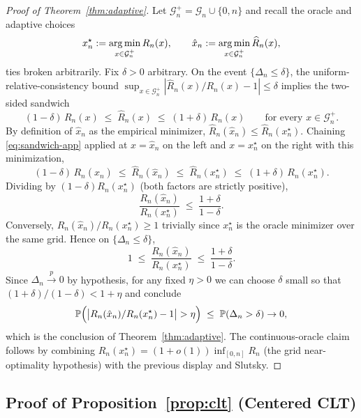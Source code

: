 \begin{proof}[Proof of Theorem~\ref{thm:adaptive}]
Let $\mathcal{G}_n^+ = \mathcal{G}_n \cup \{0, n\}$ and recall the oracle and adaptive choices
\[
x_n^\star := \operatorname*{arg\,min}_{x \in \mathcal{G}_n^+} R_n(x), \qquad
\hat x_n := \operatorname*{arg\,min}_{x \in \mathcal{G}_n^+} \widehat R_n(x),
\]
ties broken arbitrarily. Fix $\delta > 0$ arbitrary. On the event $\{\Delta_n \le \delta\}$, the uniform-relative-consistency bound $\sup_{x \in \mathcal{G}_n^+} |\widehat R_n(x)/R_n(x) - 1| \le \delta$ implies the two-sided sandwich
\begin{equation}\label{eq:sandwich-app}
(1 - \delta)\, R_n(x) \;\le\; \widehat R_n(x) \;\le\; (1 + \delta)\, R_n(x)
\qquad \text{for every } x \in \mathcal{G}_n^+.
\end{equation}
By definition of $\hat x_n$ as the empirical minimizer, $\widehat R_n(\hat x_n) \le \widehat R_n(x_n^\star)$. Chaining \cref{eq:sandwich-app} applied at $x = \hat x_n$ on the left and $x = x_n^\star$ on the right with this minimization,
\[
(1 - \delta)\, R_n(\hat x_n)
\;\le\; \widehat R_n(\hat x_n)
\;\le\; \widehat R_n(x_n^\star)
\;\le\; (1 + \delta)\, R_n(x_n^\star).
\]
Dividing by $(1 - \delta) R_n(x_n^\star)$ (both factors are strictly positive),
\[
\frac{R_n(\hat x_n)}{R_n(x_n^\star)} \;\le\; \frac{1 + \delta}{1 - \delta}.
\]
Conversely, $R_n(\hat x_n)/R_n(x_n^\star) \ge 1$ trivially since $x_n^\star$ is the oracle minimizer over the same grid. Hence on $\{\Delta_n \le \delta\}$,
\[
1 \;\le\; \frac{R_n(\hat x_n)}{R_n(x_n^\star)} \;\le\; \frac{1 + \delta}{1 - \delta}.
\]
Since $\Delta_n \stackrel{p}{\to} 0$ by hypothesis, for any fixed $\eta > 0$ we can choose $\delta$ small so that $(1+\delta)/(1-\delta) < 1 + \eta$ and conclude
\[
\mathbb{P}\Bigl(\bigl|R_n(\hat x_n)/R_n(x_n^\star) - 1\bigr| > \eta\Bigr)
\;\le\; \mathbb{P}(\Delta_n > \delta) \to 0,
\]
which is the conclusion of Theorem~\ref{thm:adaptive}. The continuous-oracle claim follows by combining $R_n(x_n^\star) = (1 + o(1)) \inf_{[0,n]} R_n$ (the grid near-optimality hypothesis) with the previous display and Slutsky.
\end{proof}

\subsection{Proof of \texorpdfstring{Proposition~\ref{prop:clt}}{Proposition~\ref{prop:clt}} (Centered CLT)}\label{proof:clt}

